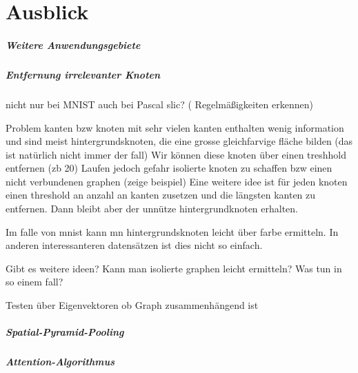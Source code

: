 \chapter{Ausblick}
\label{ausblick}

\paragraph{Weitere Anwendungsgebiete}
\label{weitere_anwendungsgebiete}

\paragraph{Entfernung irrelevanter Knoten}
\label{entfernung_irrelevanter_knoten}

nicht nur bei \gls{MNIST}
auch bei \gls{Pascal} slic? (\zB{} Regelmäßigkeiten erkennen)

Problem kanten bzw knoten mit sehr vielen kanten enthalten wenig information und sind meist hintergrundsknoten, die eine grosse gleichfarvige fläche bilden (das ist natürlich nicht immer der fall)
Wir können diese knoten über einen treshhold entfernen (zb 20)
Laufen jedoch gefahr isolierte knoten zu schaffen bzw einen nicht verbundenen graphen (zeige beispiel)
 Eine weitere idee ist für jeden knoten einen threshold an anzahl an kanten zusetzen und die längsten kanten zu entfernen. Dann bleibt aber der unnütze hintergrundknoten erhalten.

Im falle von mnist kann mn hintergrundsknoten leicht über farbe ermitteln.
In anderen interessanteren datensätzen ist dies nicht so einfach.

Gibt es weitere ideen?
Kann man isolierte graphen leicht ermitteln? Was tun in so einem fall?

Testen über Eigenvektoren ob Graph zusammenhängend ist

\paragraph{Spatial-Pyramid-Pooling}
\label{spatial_pyramid_pooling}

\paragraph{Attention-Algorithmus}
\label{attention_algorithmus}
